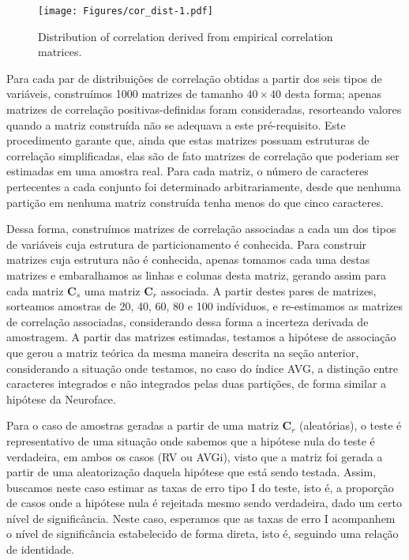 \documentclass[11pt,]{article}
\begin{document}
\begin{figure}[htbp]
\centering
\texttt{[image: Figures/cor\_dist-1.pdf]}
\caption{Distribution of correlation derived from empirical correlation
matrices. \label{fig:cor_dist}}
\end{figure}

Para cada par de distribuições de correlação obtidas a partir dos seis
tipos de variáveis, construímos 1000 matrizes de tamanho $40 \times 40$
desta forma; apenas matrizes de correlação positivas-definidas foram
consideradas, resorteando valores quando a matriz construída não se
adequava a este pré-requisito. Este procedimento garante que, ainda que
estas matrizes possuam estruturas de correlação simplificadas, elas são
de fato matrizes de correlação que poderiam ser estimadas em uma amostra
real. Para cada matriz, o número de caracteres pertecentes a cada
conjunto foi determinado arbitrariamente, desde que nenhuma partição em
nenhuma matriz construída tenha menos do que cinco caracteres.

Dessa forma, construímos matrizes de correlação associadas a cada um dos
tipos de variáveis cuja estrutura de particionamento é conhecida. Para
construir matrizes cuja estrutura não é conhecida, apenas tomamos cada
uma destas matrizes e embaralhamos as linhas e colunas desta matriz,
gerando assim para cada matriz $\mathbf{C}_s$ uma matriz $\mathbf{C}_r$
associada. A partir destes pares de matrizes, sorteamos amostras de 20,
40, 60, 80 e 100 indíviduos, e re-estimamos as matrizes de correlação
associadas, considerando dessa forma a incerteza derivada de amostragem.
A partir das matrizes estimadas, testamos a hipótese de associação que
gerou a matriz teórica da mesma maneira descrita na seção anterior,
considerando a situação onde testamos, no caso do índice AVG, a
distinção entre caracteres integrados e não integrados pelas duas
partições, de forma similar a hipótese da Neuroface.

Para o caso de amostras geradas a partir de uma matriz $\mathbf{C}_r$
(aleatórias), o teste é representativo de uma situação onde sabemos que
a hipótese nula do teste é verdadeira, em ambos os casos (RV ou AVGi),
visto que a matriz foi gerada a partir de uma aleatorização daquela
hipótese que está sendo testada. Assim, buscamos neste caso estimar as
taxas de erro tipo I do teste, isto é, a proporção de casos onde a
hipótese nula é rejeitada mesmo sendo verdadeira, dado um certo nível de
significância. Neste caso, esperamos que as taxas de erro I acompanhem o
nível de significância estabelecido de forma direta, isto é, seguindo
uma relação de identidade.
\end{document}
